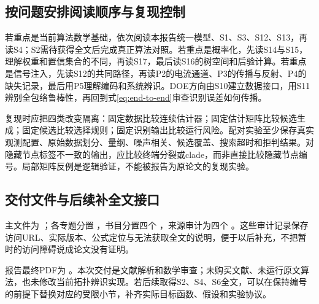 \subsection{按问题安排阅读顺序与复现控制}
若重点是当前算法数学基础，依次阅读本报告统一模型、S1、S3、S12、S13，再读S4；S2需待获得全文后完成真正算法对照。若重点是概率化，先读S14与S15，理解权重和置信集合的不同，再读S17，最后读S16的树空间和后验计算。若重点是信号注入，先读S12的共同路径，再读P2的电流通道、P3的传播与反射、P4的缺失记录，最后用P5理解编码和系统辨识。DOE方向由S10建立数据接口，用S11辨别全包络鲁棒性，再回到式\eqref{eq:end-to-end}审查识别误差如何传播。

复现时应把四类改变隔离：固定数据比较连续估计器；固定估计矩阵比较候选生成；固定候选比较选择规则；固定识别输出比较运行风险。配对实验至少保存真实观测配置、原始数据划分、量纲、噪声相关、候选覆盖、搜索超时和拒判结果。对隐藏节点标签不一致的输出，应比较终端分裂或clade，而非直接比较隐藏节点编号。局部矩阵反例是逻辑验证，不能被报告为原论文的复现实验。

\subsection{交付文件与后续补全文接口}
主文件为 ；各专题分置 ，书目分置四个 ，来源审计为四个 。这些审计记录保存访问URL、实际版本、公式定位与无法获取全文的说明，便于以后补充，不把暂时的访问障碍说成论文没有证明。

报告最终PDF为 。本次交付是文献解析和数学审查；未购买文献、未运行原文算法，也未修改当前拓扑辨识实现。若后续取得S2、S4、S6全文，可以在保持编号的前提下替换对应的受限小节，补齐实际目标函数、假设和实验协议。

